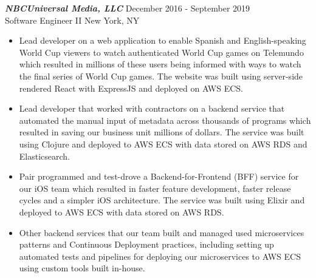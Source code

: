 {\sl \textbf{NBCUniversal Media, LLC}} \hfill December 2016 - September 2019 \\ Software Engineer II \hfill New York, NY
\begin{itemize}
    \item Lead developer on a web application to enable Spanish and English-speaking World Cup viewers to watch authenticated World Cup games on Telemundo which resulted in millions of these users being informed with ways to watch the final series of World Cup games. The website was built using server-side rendered React with ExpressJS and deployed on AWS ECS.
    \item Lead developer that worked with contractors on a backend service that automated the manual input of metadata across thousands of programs which resulted in saving our business unit millions of dollars. The service was built using Clojure and deployed to AWS ECS with data stored on AWS RDS and Elasticsearch.
    \item Pair programmed and test-drove a Backend-for-Frontend (BFF) service for our iOS team which resulted in faster feature development, faster release cycles and a simpler iOS architecture. The service was built using Elixir and deployed to AWS ECS with data stored on AWS RDS.
    \item Other backend services that our team built and managed used microservices patterns and Continuous Deployment practices, including setting up automated tests and pipelines for deploying our microservices to AWS ECS using custom tools built in-house.
\end{itemize}
